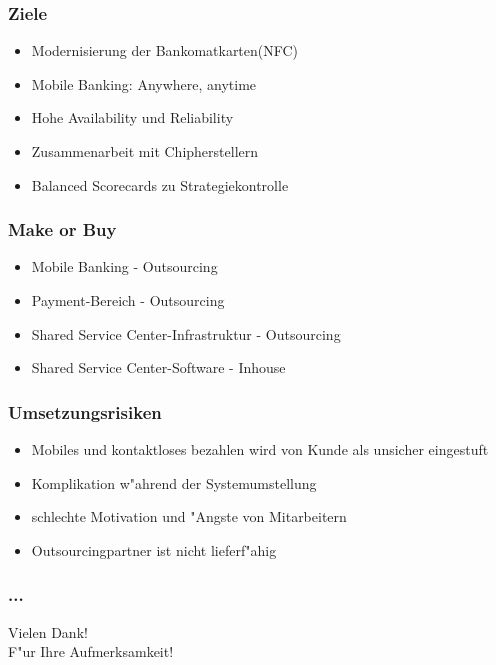 \documentclass{beamer}
\begin{document}
\begin{frame}
  \frametitle{Ziele}
  \begin{itemize}

	\item Modernisierung der Bankomatkarten(NFC)
	\item Mobile Banking: Anywhere, anytime
	\item Hohe Availability und Reliability
	\item Zusammenarbeit mit Chipherstellern
	\item Balanced Scorecards zu Strategiekontrolle

  \end{itemize}
\end{frame}

\begin{frame}
  \frametitle{Make or Buy}
  \begin{itemize}

	\item Mobile Banking - Outsourcing
	\item Payment-Bereich - Outsourcing
	\item Shared Service Center-Infrastruktur - Outsourcing
	\item Shared Service Center-Software - Inhouse

  \end{itemize}
\end{frame}

\begin{frame}
  \frametitle{Umsetzungsrisiken}
  \begin{itemize}

	\item Mobiles und kontaktloses bezahlen wird von Kunde als unsicher eingestuft
	\item Komplikation w"ahrend der Systemumstellung
	\item schlechte Motivation und "Angste von Mitarbeitern
	\item Outsourcingpartner ist nicht lieferf"ahig

  \end{itemize}
\end{frame}

\begin{frame}

  \frametitle{...}
   	Vielen Dank! \\
	F"ur Ihre Aufmerksamkeit!

\end{frame}
\end{document}
